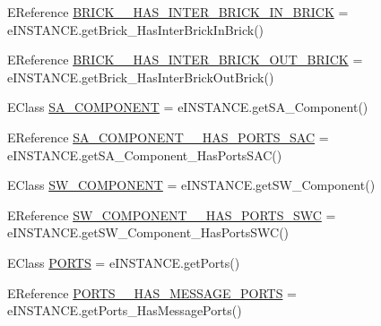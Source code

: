 \begin{DoxyCompactItemize}
E\-Reference \hyperlink{interfaceshootingmachineemfmodel_1_1_shootingmachineemfmodel_package_1_1_literals_a88a578651b01ca8d696df5e511b804c3}{B\-R\-I\-C\-K\-\_\-\-\_\-\-H\-A\-S\-\_\-\-I\-N\-T\-E\-R\-\_\-\-B\-R\-I\-C\-K\-\_\-\-I\-N\-\_\-\-B\-R\-I\-C\-K} = e\-I\-N\-S\-T\-A\-N\-C\-E.\-get\-Brick\-\_\-\-Has\-Inter\-Brick\-In\-Brick()
\item 
E\-Reference \hyperlink{interfaceshootingmachineemfmodel_1_1_shootingmachineemfmodel_package_1_1_literals_adbf3f5f867f77e8462a1f525df767381}{B\-R\-I\-C\-K\-\_\-\-\_\-\-H\-A\-S\-\_\-\-I\-N\-T\-E\-R\-\_\-\-B\-R\-I\-C\-K\-\_\-\-O\-U\-T\-\_\-\-B\-R\-I\-C\-K} = e\-I\-N\-S\-T\-A\-N\-C\-E.\-get\-Brick\-\_\-\-Has\-Inter\-Brick\-Out\-Brick()
\item 
E\-Class \hyperlink{interfaceshootingmachineemfmodel_1_1_shootingmachineemfmodel_package_1_1_literals_a02c09c502db1f3c903cbd6282befc333}{S\-A\-\_\-\-C\-O\-M\-P\-O\-N\-E\-N\-T} = e\-I\-N\-S\-T\-A\-N\-C\-E.\-get\-S\-A\-\_\-\-Component()
\item 
E\-Reference \hyperlink{interfaceshootingmachineemfmodel_1_1_shootingmachineemfmodel_package_1_1_literals_a84f344e1e40c66de4c0fab095b97b7ee}{S\-A\-\_\-\-C\-O\-M\-P\-O\-N\-E\-N\-T\-\_\-\-\_\-\-H\-A\-S\-\_\-\-P\-O\-R\-T\-S\-\_\-\-S\-A\-C} = e\-I\-N\-S\-T\-A\-N\-C\-E.\-get\-S\-A\-\_\-\-Component\-\_\-\-Has\-Ports\-S\-A\-C()
\item 
E\-Class \hyperlink{interfaceshootingmachineemfmodel_1_1_shootingmachineemfmodel_package_1_1_literals_a4efac8ee87bb281dc7448e386107964d}{S\-W\-\_\-\-C\-O\-M\-P\-O\-N\-E\-N\-T} = e\-I\-N\-S\-T\-A\-N\-C\-E.\-get\-S\-W\-\_\-\-Component()
\item 
E\-Reference \hyperlink{interfaceshootingmachineemfmodel_1_1_shootingmachineemfmodel_package_1_1_literals_acce8f7d770b974806d1073dc91d451ea}{S\-W\-\_\-\-C\-O\-M\-P\-O\-N\-E\-N\-T\-\_\-\-\_\-\-H\-A\-S\-\_\-\-P\-O\-R\-T\-S\-\_\-\-S\-W\-C} = e\-I\-N\-S\-T\-A\-N\-C\-E.\-get\-S\-W\-\_\-\-Component\-\_\-\-Has\-Ports\-S\-W\-C()
\item 
E\-Class \hyperlink{interfaceshootingmachineemfmodel_1_1_shootingmachineemfmodel_package_1_1_literals_a4a3e6c42963dc5b7edae879c0e1dddff}{P\-O\-R\-T\-S} = e\-I\-N\-S\-T\-A\-N\-C\-E.\-get\-Ports()
\item 
E\-Reference \hyperlink{interfaceshootingmachineemfmodel_1_1_shootingmachineemfmodel_package_1_1_literals_af1aad2cd07c3bdb92ac4925b82c06d86}{P\-O\-R\-T\-S\-\_\-\-\_\-\-H\-A\-S\-\_\-\-M\-E\-S\-S\-A\-G\-E\-\_\-\-P\-O\-R\-T\-S} = e\-I\-N\-S\-T\-A\-N\-C\-E.\-get\-Ports\-\_\-\-Has\-Message\-Ports()

\end{DoxyCompactItemize}

